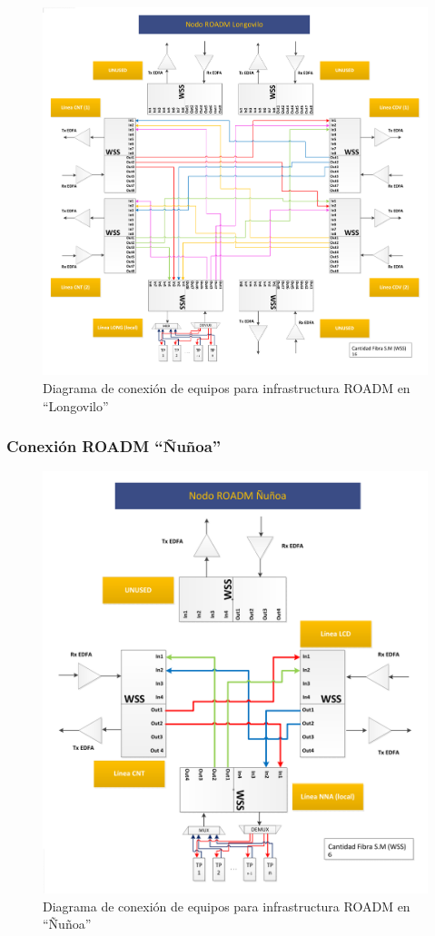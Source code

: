 \begin{figure}[H]
  \centering
  \includegraphics[width=17cm]{Imagenes/LONG.pdf}
  \caption{Diagrama de conexión de equipos para infrastructura ROADM en ``Longovilo''}
  \label{fig:drlong}
\end{figure}

\subsubsection{Conexión ROADM ``Ñuñoa''}
\label{sec:drnna}

\begin{figure}[H]
  \centering
  \includegraphics[width=17cm]{Imagenes/NNA.pdf}
  \caption{Diagrama de conexión de equipos para infrastructura ROADM en ``Ñuñoa''}
  \label{fig:drnna}
\end{figure}

